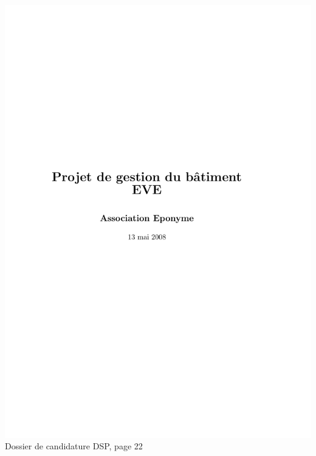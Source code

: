 \includegraphics[scale=0.85,trim=20mm 20mm 20mm 20mm,clip,page=22]{annexes/candidature_dsp.pdf} \\
Dossier de candidature DSP, page 22
\newpage
